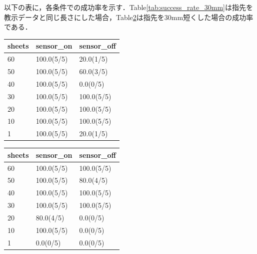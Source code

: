 以下の表に，各条件での成功率を示す．Table\ref{tab:success_rate_30mm}は指先を教示データと同じ長さにした場合，Table\ref{tab:success_rate_0mm}は指先を30mm短くした場合の成功率である．\par

\begin{table}[htbp]
\centering
\begin{minipage}[t]{0.48\textwidth}
  \centering
  \label{tab:success_rate_30mm}
  \begin{tabular}{|l|l|l|}
  \hline
  sheets & sensor\_on & sensor\_off \\ \hline
  60     & 100.0(5/5) & 20.0(1/5)   \\ \hline
  50     & 100.0(5/5) & 60.0(3/5)   \\ \hline
  40     & 100.0(5/5) & 0.0(0/5)    \\ \hline
  30     & 100.0(5/5) & 100.0(5/5)  \\ \hline
  20     & 100.0(5/5) & 100.0(5/5)  \\ \hline
  10     & 100.0(5/5) & 100.0(5/5)  \\ \hline
  1      & 100.0(5/5) & 20.0(1/5)   \\ \hline
  \end{tabular}
\end{minipage}\hfill
\begin{minipage}[t]{0.48\textwidth}
  \centering
  \label{tab:success_rate_0mm}
  \begin{tabular}{|l|l|l|}
  \hline
  sheets & sensor\_on  & sensor\_off \\ \hline
  60     & 100.0(5/5) & 100.0(5/5) \\ \hline
  50     & 100.0(5/5) & 80.0(4/5) \\ \hline
  40     & 100.0(5/5) & 100.0(5/5) \\ \hline
  30     & 100.0(5/5) & 100.0(5/5) \\ \hline
  20     & 80.0(4/5)  & 0.0(0/5)  \\ \hline
  10     & 100.0(5/5) & 0.0(0/5)   \\ \hline
  1      & 0.0(0/5)   & 0.0(0/5)   \\ \hline
  \end{tabular}
\end{minipage}
\end{table}

